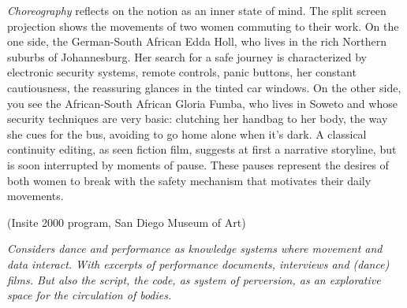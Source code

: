{{


{\em Choreography} reflects on the notion  as an
inner state of mind. The split screen projection shows the movements of
two women commuting to their work. On the one side, the German{}-South
African Edda Holl, who lives in the rich Northern suburbs of
Johannesburg. Her search for a safe journey is characterized by
electronic security systems, remote controls, panic buttons, her
constant cautiousness, the reassuring glances in the tinted car
windows. On the other side, you see the African{}-South African Gloria
Fumba, who lives in Soweto and whose security techniques are very
basic: clutching her handbag to her body, the way she cues for the bus,
avoiding to go home alone when it's dark. A classical continuity
editing, as seen fiction film, suggests at first a narrative storyline,
but is soon interrupted by moments of pause. These pauses represent the
desires of both women to break with the safety mechanism that motivates
their daily movements. 
\blank
{}



 (Insite 2000 program, San Diego Museum
of Art)\par
}

{\em Considers dance and performance as knowledge systems where movement and
data interact. With excerpts of performance documents, interviews and
(dance) films. But also the script, the code, as system of perversion,
as an explorative space for the circulation of bodies.}

}
